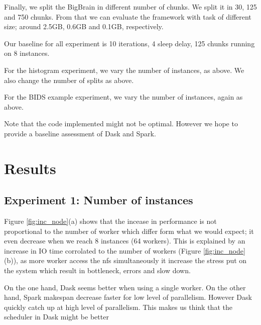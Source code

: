 \documentclass[11pt,a4paper]{article}
\begin{document}
Finally, we split the BigBrain in different number of chunks. We split it in 30, 125
and 750 chunks. From that we can evaluate the framework with task of different size;
around 2.5GB, 0.6GB and 0.1GB, respectively.

Our baseline for all experiment is 10 iterations, 4 sleep delay, 125 chunks running
on 8 instances.

For the histogram experiment, we vary the number of instances, as above. We also
change the number of splits as above.

For the BIDS example experiment, we vary the number of instances, again as above.

Note that the code implemented might not be optimal. However we hope to provide a
baseline assessment of Dask and Spark.


\section{Results}

\subsection{Experiment 1: Number of instances}
Figure \ref{fig:inc_node}(a) shows that the incease in performance is not
proportional to the number of worker which differ form what we would expect; it even
decrease when we reach 8 instances (64 workers). This is explained by an increase in
IO time corrolated to the number of workers (Figure \ref{fig:inc_node}(b)), as more
worker access the nfs simultaneously it increase the stress put on the system which
result in bottleneck, errors and slow down.

On the one hand, Dask seems better when
using a single worker. On the other hand, Spark makespan decrease faster for low
level of parallelism. However Dask quickly catch up at high level of parallelism.
This makes us think that the scheduler in Dask might be better
\end{document}
